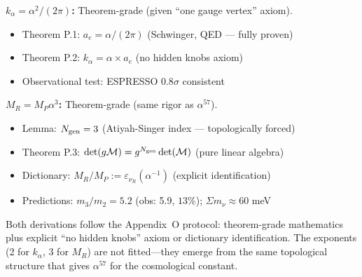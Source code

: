 \begin{tcolorbox}[colback=blue!5!white, colframe=blue!60!black, title=Appendix P: Theorem Status]
\textbf{$k_\alpha = \alpha^2/(2\pi)$:} Theorem-grade (given ``one gauge vertex'' axiom).
\begin{itemize}
\item Theorem P.1: $a_e = \alpha/(2\pi)$ (Schwinger, QED --- fully proven)
\item Theorem P.2: $k_\alpha = \alpha \times a_e$ (no hidden knobs axiom)
\item Observational test: ESPRESSO $0.8\sigma$ consistent
\end{itemize}

\vspace{0.3em}
\textbf{$M_R = M_P\alpha^3$:} Theorem-grade (same rigor as $\alpha^{57}$).
\begin{itemize}
\item Lemma: $N_{\rm gen} = 3$ (Atiyah-Singer index --- topologically forced)
\item Theorem P.3: $\det(g\mathcal{M}) = g^{N_{\rm gen}}\det(\mathcal{M})$ (pure linear algebra)
\item Dictionary: $M_R/M_P := \varepsilon_{\nu_R}(\alpha^{-1})$ (explicit identification)
\item Predictions: $m_3/m_2 = 5.2$ (obs: 5.9, $13\%$); $\Sigma m_\nu \approx 60$ meV
\end{itemize}
\end{tcolorbox}

Both derivations follow the Appendix~O protocol: theorem-grade mathematics plus explicit ``no hidden knobs'' 
axiom or dictionary identification. The exponents (2 for $k_\alpha$, 3 for $M_R$) are not fitted---they emerge 
from the same topological structure that gives $\alpha^{57}$ for the cosmological constant.
